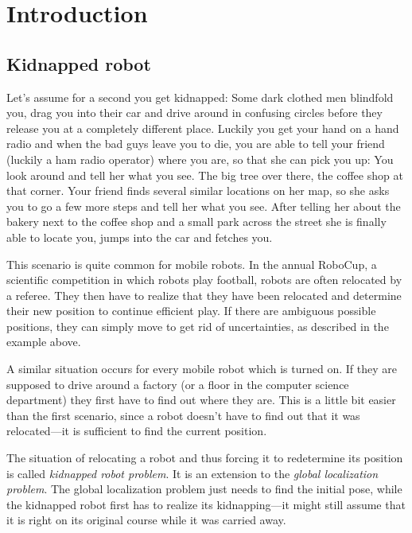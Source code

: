 \documentclass[Thesis.tex]{subfiles}
\begin{document}
\chapter{Introduction}

\section{Kidnapped robot}

Let's assume for a second you get kidnapped: Some dark clothed men blindfold you, drag you into their car and drive around in confusing circles before they release you at a completely different place. Luckily you get your hand on a hand radio and when the bad guys leave you to die, you are able to tell your friend (luckily a ham radio operator) where you are, so that she can pick you up: You look around and tell her what you see. The big tree over there, the coffee shop at that corner. Your friend finds several similar locations on her map, so she asks you to go a few more steps and tell her what you see. After telling her about the bakery next to the coffee shop and a small park across the street she is finally able to locate you, jumps into the car and fetches you.

This scenario is quite common for mobile robots. In the annual RoboCup, a scientific competition in which robots play football\cite{robocup}, robots are often relocated by a referee\cite{ThrunBurgardFox:2005}. They then have to realize that they have been relocated and determine their new position to continue efficient play. If there are ambiguous possible positions, they can simply move to get rid of uncertainties, as described in the example above.

A similar situation occurs for every mobile robot which is turned on. If they are supposed to drive around a factory (or a floor in the computer science department) they first have to find out where they are. This is a little bit easier than the first scenario, since a robot doesn't have to find out that it was relocated---it is sufficient to find the current position.

The situation of relocating a robot and thus forcing it to redetermine its position is called \emph{kidnapped robot problem}\cite{ThrunBurgardFox:2005}. It is an extension to the \emph{global localization problem}. The global localization problem just needs to find the initial pose, while the kidnapped robot first has to realize its kidnapping---it might still assume that it is right on its original course while it was carried away.
\end{document}

